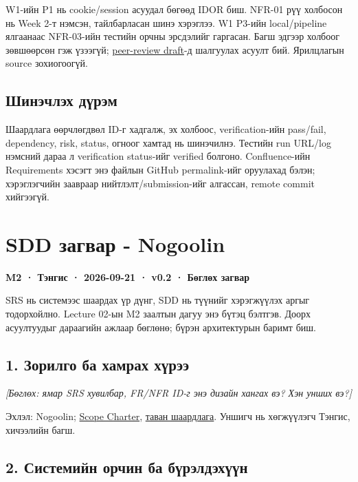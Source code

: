 \documentclass[
  11pt,
  a4paper,
]{article}
\begin{document}
W1-ийн P1 нь cookie/session асуудал бөгөөд IDOR биш. NFR-01 рүү холбосон
нь Week 2-т нэмсэн, тайлбарласан шинэ хэрэглээ. W1 P3-ийн local/pipeline
ялгаанаас NFR-03-ийн тестийн орчны эрсдэлийг гаргасан. Багш эдгээр
холбоог зөвшөөрсөн гэж үзээгүй;
\href{wiki/peer-review-draft.md}{peer-review draft}-д шалгуулах асуулт
бий. Ярилцлагын source зохиогоогүй.

\subsection{Шинэчлэх
дүрэм}\label{doc5-ux448ux438ux43dux44dux447ux43bux44dux445-ux434ux4afux440ux44dux43c}

Шаардлага өөрчлөгдвөл ID-г хадгалж, эх холбоос, verification-ийн
pass/fail, dependency, risk, status, огноог хамтад нь шинэчилнэ. Тестийн
run URL/log нэмсний дараа л verification status-ийг verified болгоно.
Confluence-ийн Requirements хэсэгт энэ файлын GitHub permalink-ийг
оруулахад бэлэн; хэрэглэгчийн заавраар нийтлэлт/submission-ийг алгассан,
remote commit хийгээгүй.

\endgroup
\clearpage
\section{SDD загвар -
Nogoolin}\label{doc6-sdd-ux437ux430ux433ux432ux430ux440---nogoolin}

\textbf{M2 · Тэнгис · 2026-09-21 · v0.2 · Бөглөх загвар}

SRS нь системээс шаардах үр дүнг, SDD нь түүнийг хэрэгжүүлэх аргыг
тодорхойлно. Lecture 02-ын M2 заалтын дагуу энэ бүтэц бэлтгэв. Доорх
асуултуудыг дараагийн ажлаар бөглөнө; бүрэн архитектурын баримт биш.

\subsection{1. Зорилго ба хамрах
хүрээ}\label{doc6-ux437ux43eux440ux438ux43bux433ux43e-ux431ux430-ux445ux430ux43cux440ux430ux445-ux445ux4afux440ux44dux44d}

\emph{{[}Бөглөх: ямар SRS хувилбар, FR/NFR ID-г энэ дизайн хангах вэ?
Хэн унших вэ?{]}}

Эхлэл: Nogoolin; \href{../../requirements/scope-charter.md}{Scope
Charter}, \href{../../requirements/requirements.md}{таван шаардлага}.
Уншигч нь хөгжүүлэгч Тэнгис, хичээлийн багш.

\subsection{2. Системийн орчин ба
бүрэлдэхүүн}\label{doc6-ux441ux438ux441ux442ux435ux43cux438ux439ux43d-ux43eux440ux447ux438ux43d-ux431ux430-ux431ux4afux440ux44dux43bux434ux44dux445ux4afux4afux43d}
\end{document}
